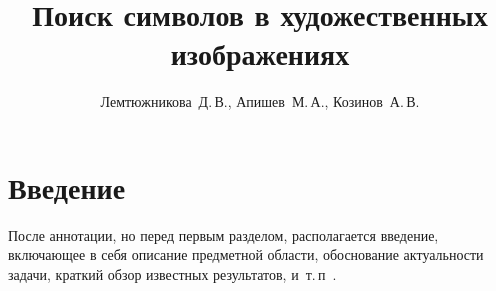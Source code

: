 \documentclass[12pt,twoside]{article}
\title
    [Поиск символов в художественных изображениях] %
    {Поиск символов в художественных изображениях}
\author
    {Лемтюжникова~Д.\,В., Апишев~М.\,А., Козинов~А.\,В.} %
\begin{document}
\maketitle
\section{Введение}
После аннотации, но перед первым разделом,
располагается введение, включающее в себя
описание предметной области,
обоснование актуальности задачи,
краткий обзор известных результатов,
и~т.\,п~\cite{author09anyscience,myHandbook,author09first-word-of-the-title,voron06latex,author-and-co2007,Lvovsky03}.





\end{document}
